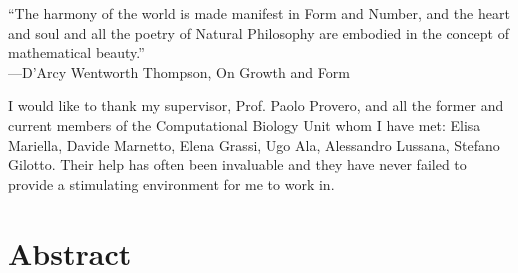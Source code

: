 \documentclass[a4paper,oneside,marginals=justified,nobib]{tufte-book}
\begin{document}
\cleardoublepage
\null{}
\begin{doublespace}
\noindent\fontsize{15}{15}\selectfont\itshape
\nohyphenation

\enquote{The harmony of the world is made manifest in Form and Number, 
	and the heart and soul and all the poetry of Natural Philosophy are 
	embodied in the concept of mathematical beauty.}\\
---D'Arcy Wentworth Thompson, \textnormal{On Growth and Form}


\noindent\fontsize{15}{15}\selectfont\itshape

I would like to thank my supervisor, Prof. Paolo Provero, and all the 
former and current members of the Computational Biology Unit whom I have 
met: Elisa Mariella, Davide Marnetto, Elena Grassi, Ugo Ala, Alessandro 
Lussana, Stefano Gilotto. Their help has often been invaluable and they 
have never failed to provide a stimulating environment for me to work 
in.

\end{doublespace}
\null


\cleardoublepage
\chapter{Abstract} %
\end{document}
